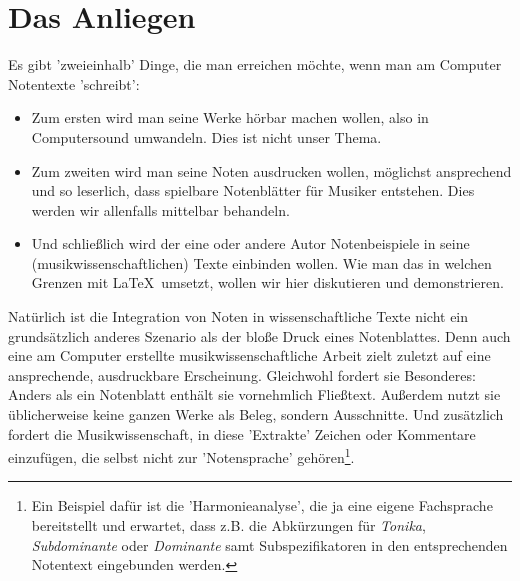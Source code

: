 %
%
%



\section{Das Anliegen}

Es gibt 'zweieinhalb' Dinge, die man erreichen möchte, wenn man am Computer
Notentexte 'schreibt':

\begin{itemize}
  \item Zum ersten wird man seine Werke hörbar machen wollen, also in
  Computersound umwandeln. Dies ist nicht unser Thema.
  \item Zum zweiten wird man seine Noten ausdrucken wollen, möglichst
  ansprechend und so leserlich, dass spielbare Notenblätter für Musiker
  entstehen. Dies werden wir allenfalls mittelbar behandeln.
  \item Und schließlich wird der eine oder andere Autor Notenbeispiele in seine
  (musikwissenschaftlichen) Texte einbinden wollen. Wie man das in welchen
  Grenzen mit \LaTeX\ umsetzt, wollen wir hier diskutieren und demonstrieren.
\end{itemize}

Natürlich ist die Integration von Noten in wissenschaftliche Texte nicht ein
grundsätzlich anderes Szenario als der bloße Druck eines Notenblattes.
Denn auch eine am Computer erstellte musikwissenschaftliche Arbeit zielt zuletzt
auf eine ansprechende, ausdruckbare Erscheinung. Gleichwohl fordert sie
Besonderes: Anders als ein Notenblatt enthält sie vornehmlich Fließtext.
Außerdem nutzt sie üblicherweise keine ganzen Werke als Beleg, sondern
Ausschnitte. Und zusätzlich fordert die Musikwissenschaft, in diese 'Extrakte'
Zeichen oder Kommentare einzufügen, die selbst nicht zur 'Notensprache'
gehören\footnote{Ein Beispiel dafür ist die 'Harmonieanalyse', die ja eine
eigene Fachsprache bereitstellt und erwartet, dass z.B. die Abkürzungen für
\textit{Tonika}, \textit{Subdominante} oder \textit{Dominante} samt Subspezifikatoren
in den entsprechenden Notentext eingebunden werden.}.

